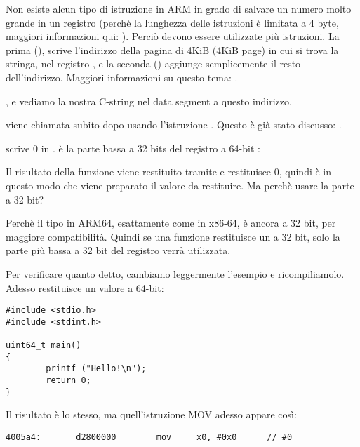 Non esiste alcun tipo di istruzione in ARM in grado di salvare un numero molto grande in un registro (perchè la lunghezza delle
istruzioni è limitata a 4 byte, maggiori informazioni qui: ).
Perciò devono essere utilizzate più istruzioni. La prima (), scrive l'indirizzo della pagina di 4KiB (4KiB page)
in cui si trova la stringa, nel registro , e la seconda (\ADD) aggiunge semplicemente il resto dell'indirizzo.
Maggiori informazioni su questo tema: .

, e vediamo la nostra C-string  nel  data segment a questo indirizzo.


\puts viene chiamata subito dopo usando l'istruzione . Questo è già stato discusso: .

\MOV scrive 0 in .
 è la parte bassa a 32 bits del registro a 64-bit :



Il risultato della funzione viene restituito tramite  e \main restituisce 0, quindi è in questo modo che viene preparato
il valore da restituire.
Ma perchè usare la parte a 32-bit?

Perchè il tipo \Tint in ARM64, esattamente come in x86-64, è ancora a 32 bit, per maggiore compatibilità.
Quindi se una funzione restituisce un \Tint a 32 bit, solo la parte più bassa a 32 bit del registro  verrà utilizzata.

Per verificare quanto detto, cambiamo leggermente l'esempio e ricompiliamolo.
Adesso \main restituisce un valore a 64-bit:

\begin{lstlisting}[caption=\main returning a value of \TT{uint64\_t} type,style=customc]
#include <stdio.h>
#include <stdint.h>

uint64_t main()
{
        printf ("Hello!\n");
        return 0;
}
\end{lstlisting}

Il risultato è lo stesso, ma quell'istruzione MOV adesso appare così:

\begin{lstlisting}[caption=\NonOptimizing GCC 4.8.1 + objdump]
  4005a4:       d2800000        mov     x0, #0x0      // #0
\end{lstlisting}


